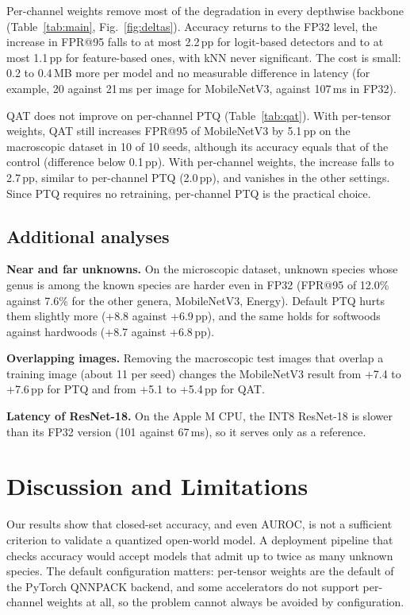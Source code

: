 \documentclass[conference]{IEEEtran}
\begin{document}


Per-channel weights remove most of the degradation in every depthwise backbone (Table~\ref{tab:main}, Fig.~\ref{fig:deltas}). Accuracy returns to the FP32 level, the increase in FPR@95 falls to at most 2.2\,pp for logit-based detectors and to at most 1.1\,pp for feature-based ones, with kNN never significant. The cost is small: 0.2 to 0.4\,MB more per model and no measurable difference in latency (for example, 20 against 21\,ms per image for MobileNetV3, against 107\,ms in FP32).

QAT does not improve on per-channel PTQ (Table~\ref{tab:qat}). With per-tensor weights, QAT still increases FPR@95 of MobileNetV3 by 5.1\,pp on the macroscopic dataset in 10 of 10 seeds, although its accuracy equals that of the control (difference below 0.1\,pp). With per-channel weights, the increase falls to 2.7\,pp, similar to per-channel PTQ (2.0\,pp), and vanishes in the other settings. Since PTQ requires no retraining, per-channel PTQ is the practical choice.

\subsection{Additional analyses}
\label{sec:extra}

\textbf{Near and far unknowns.} On the microscopic dataset, unknown species whose genus is among the known species are harder even in FP32 (FPR@95 of 12.0\% against 7.6\% for the other genera, MobileNetV3, Energy). Default PTQ hurts them slightly more (+8.8 against +6.9\,pp), and the same holds for softwoods against hardwoods (+8.7 against +6.8\,pp).

\textbf{Overlapping images.} Removing the macroscopic test images that overlap a training image (about 11 per seed) changes the MobileNetV3 result from +7.4 to +7.6\,pp for PTQ and from +5.1 to +5.4\,pp for QAT.

\textbf{Latency of ResNet-18.} On the Apple M CPU, the INT8 ResNet-18 is slower than its FP32 version (101 against 67\,ms), so it serves only as a reference.

\section{Discussion and Limitations}

Our results show that closed-set accuracy, and even AUROC, is not a sufficient criterion to validate a quantized open-world model. A deployment pipeline that checks accuracy would accept models that admit up to twice as many unknown species. The default configuration matters: per-tensor weights are the default of the PyTorch QNNPACK backend, and some accelerators do not support per-channel weights at all, so the problem cannot always be avoided by configuration.
\end{document}

